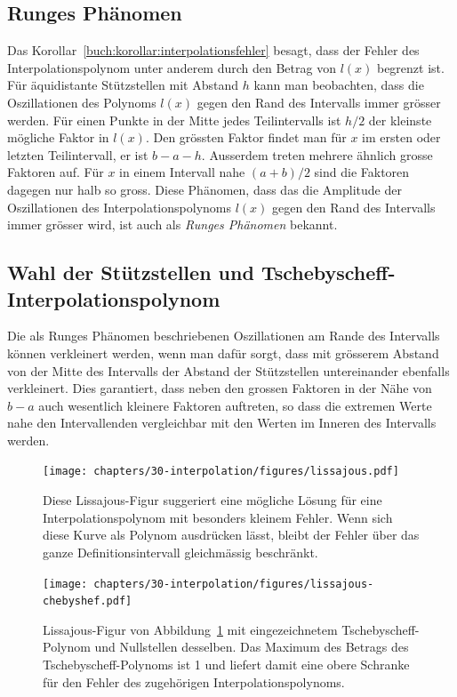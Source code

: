 \subsection{Runges Phänomen
\label{buch:section:interpolation:runge}}
%
%
Das Korollar~\ref{buch:korollar:interpolationsfehler} besagt, dass der
Fehler des Interpolationspolynom unter anderem durch den Betrag von $l(x)$
begrenzt ist.
Für äquidistante Stützstellen mit Abstand $h$ kann man beobachten,
dass die Oszillationen des Polynoms $l(x)$ gegen den Rand des Intervalls
immer grösser werden.
%
Für einen Punkte in der Mitte jedes Teilintervalls ist $h/2$ der kleinste
mögliche Faktor in $l(x)$. 
Den grössten Faktor findet man für $x$ im ersten oder letzten Teilintervall,
er ist $b-a-h$.
Ausserdem treten mehrere ähnlich grosse Faktoren auf.
Für $x$ in einem Intervall nahe $(a+b)/2$ sind die Faktoren
dagegen nur halb so gross.
Diese Phänomen, dass das die Amplitude der Oszillationen des
Interpolationspolynoms $l(x)$ gegen den Rand des Intervalls immer
grösser wird, ist auch als {\em Runges Phänomen} bekannt.

%
%
\subsection{Wahl der Stützstellen und Tschebyscheff-Interpolationspolynom
\label{buch:section:interpolation:tschebyscheff}}
Die als Runges Phänomen beschriebenen Oszillationen am Rande des Intervalls
können verkleinert werden, wenn man dafür sorgt, dass
mit grösserem Abstand von der Mitte des Intervalls der Abstand der
Stützstellen untereinander ebenfalls verkleinert.
%
%
Dies garantiert, dass neben den grossen Faktoren in der Nähe von $b-a$ 
auch wesentlich kleinere Faktoren auftreten, so dass die extremen Werte
nahe den Intervallenden vergleichbar mit den Werten im Inneren des
Intervalls werden.

\begin{figure}
\centering
\texttt{[image: chapters/30-interpolation/figures/lissajous.pdf]}
\caption{Diese Lissajous-Figur suggeriert eine mögliche Lösung für eine 
Interpolationspolynom mit besonders kleinem Fehler.
%
Wenn sich diese Kurve als Polynom ausdrücken lässt, bleibt der Fehler über
das ganze Definitionsintervall gleichmässig beschränkt.
\label{buch:figure:lissajous}}
\end{figure}

\begin{figure}
\centering
\texttt{[image: chapters/30-interpolation/figures/lissajous-chebyshef.pdf]}
\caption{Lissajous-Figur von Abbildung~\ref{buch:figure:lissajous}
mit eingezeichnetem Tschebyscheff-Polynom und Nullstellen
desselben.
%
%
Das Maximum des Betrags des Tschebyscheff-Polynoms ist 1 und liefert 
damit eine obere Schranke für den Fehler des zugehörigen
Interpolationspolynoms.
%
\label{buch:figure:lissajous-chebyshef}}
\end{figure}

